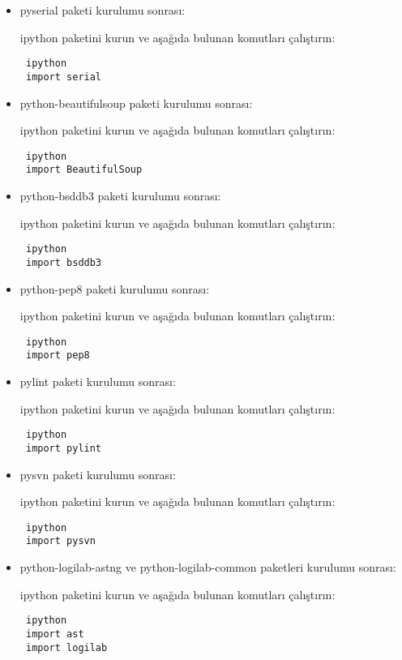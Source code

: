 \documentclass[a4paper,10pt]{article}
\begin{document}
\begin{itemize}
\item pyserial  paketi kurulumu sonrası:

ipython paketini kurun ve aşağıda bulunan komutları çalıştırın:
\begin{verbatim}
 ipython
 import serial
\end{verbatim}

\item python-beautifulsoup  paketi kurulumu sonrası:

ipython paketini kurun ve aşağıda bulunan komutları çalıştırın:
\begin{verbatim}
 ipython
 import BeautifulSoup
\end{verbatim}

\item python-bsddb3  paketi kurulumu sonrası:

ipython paketini kurun ve aşağıda bulunan komutları çalıştırın:
\begin{verbatim}
 ipython
 import bsddb3
\end{verbatim}

\item python-pep8  paketi kurulumu sonrası:

ipython paketini kurun ve aşağıda bulunan komutları çalıştırın:
\begin{verbatim}
 ipython
 import pep8
\end{verbatim}

\item pylint  paketi kurulumu sonrası:

ipython paketini kurun ve aşağıda bulunan komutları çalıştırın:
\begin{verbatim}
 ipython
 import pylint
\end{verbatim}

\item pysvn  paketi kurulumu sonrası:

ipython paketini kurun ve aşağıda bulunan komutları çalıştırın:
\begin{verbatim}
 ipython
 import pysvn
\end{verbatim}

\item python-logilab-astng ve python-logilab-common  paketleri kurulumu sonrası:

ipython paketini kurun ve aşağıda bulunan komutları çalıştırın:
\begin{verbatim}
 ipython
 import ast
 import logilab
\end{verbatim}



\end{itemize}
\end{document}
